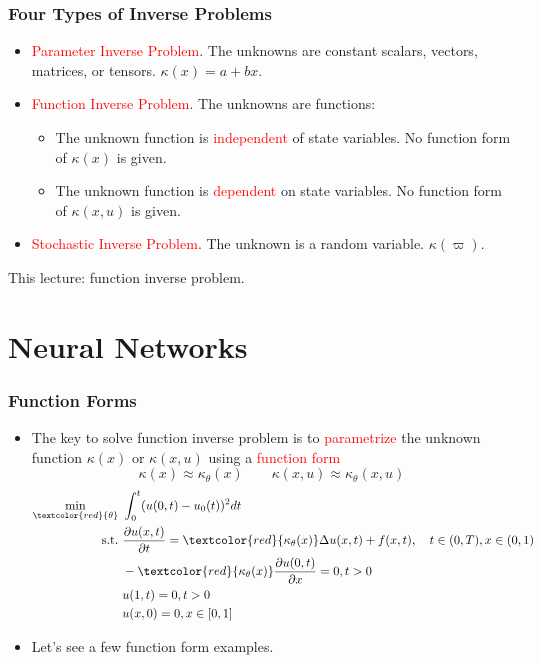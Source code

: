 \documentclass{beamer}
\begin{document}
\begin{frame}
	\frametitle{Four Types of Inverse Problems}
	
	\begin{itemize}
		\item \textcolor{red}{Parameter Inverse Problem}. The unknowns are constant scalars, vectors, matrices, or tensors. $\kappa(x) = a + bx$.
		\item \textcolor{red}{Function Inverse Problem}. The unknowns are functions:
		\begin{itemize}
		\item The unknown function is \textcolor{red}{independent} of state variables. No function form of $\kappa(x)$ is given. 
		\item The unknown function is \textcolor{red}{dependent} on state variables. No function form of $\kappa(x, u)$ is given. 
		\end{itemize}
		\item \textcolor{red}{Stochastic Inverse Problem}. The unknown is a random variable. $\kappa(\varpi)$.
	\end{itemize}
	
	This lecture: function inverse problem. 
\end{frame}


\section{Neural Networks}


\begin{frame}
	\frametitle{Function Forms}
	
\begin{itemize}
	\item The key to solve function inverse problem is to \textcolor{red}{parametrize} the unknown function $\kappa(x)$ or $\kappa(x, u)$ using a \textcolor{red}{function form}
	$$\kappa(x) \approx \kappa_\theta(x) \qquad \kappa(x, u) \approx \kappa_\theta(x, u)$$
	\begin{align*}
\min_{\textcolor{red}{\theta}}\ & \int_{0}^t ( u(0, t)- u_0(t))^2 dt\\
\mathrm{s.t.}\ & \frac{\partial u(x, t)}{\partial t} = \textcolor{red}{\kappa_\theta(x)}\Delta u(x, t) + f(x, t), \quad t\in (0,T), x\in (0,1) \\
& -\textcolor{red}{\kappa_\theta(x)}\frac{\partial u(0,t)}{\partial x} = 0, t>0\\
& u(1, t) = 0, t>0\\
& u(x, 0) = 0, x\in [0,1]
\end{align*}

\item Let's see a few function form examples. 
\end{itemize}
\end{frame}
\end{document}
